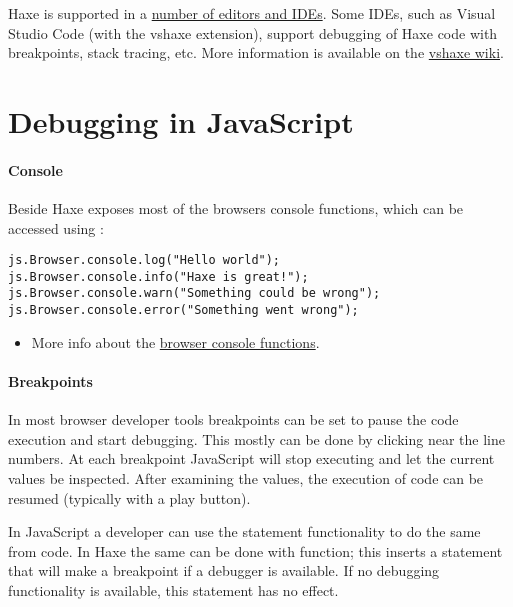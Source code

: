 Haxe is supported in a \href{https://haxe.org/documentation/introduction/editors-and-ides.html}{number of editors and IDEs}. Some IDEs, such as Visual Studio Code (with the vshaxe extension), support debugging of Haxe code with breakpoints, stack tracing, etc. More information is available on the \href{https://github.com/vshaxe/vshaxe/wiki/Debugging}{vshaxe wiki}.


\section{Debugging in JavaScript}
\label{debugging-javascript}

\paragraph{Console}

Beside  Haxe exposes most of the browsers console functions, which can be accessed using \href{http://api.haxe.org/v/dev/js/html/Console.html}{}:

\begin{lstlisting}
js.Browser.console.log("Hello world"); 
js.Browser.console.info("Haxe is great!"); 
js.Browser.console.warn("Something could be wrong"); 
js.Browser.console.error("Something went wrong"); 
\end{lstlisting}


\begin{itemize}
	\item More info about the \href{https://developer.mozilla.org/en-US/docs/Web/API/Console}{browser console functions}.
\end{itemize}

\paragraph{Breakpoints}

In most browser developer tools breakpoints can be set to pause the code execution and start debugging. This mostly can be done by clicking near the line numbers. At each breakpoint JavaScript will stop executing and let the current values be inspected. After examining the values, the execution of code can be resumed (typically with a play button).

In JavaScript a developer can use the  statement functionality to do the same from code.
In Haxe the same can be done with \href{http://api.haxe.org/v/js/Lib.html#debug}{} function; this inserts a  statement that will make a breakpoint if a debugger is available. If no debugging functionality is available, this statement has no effect. 

